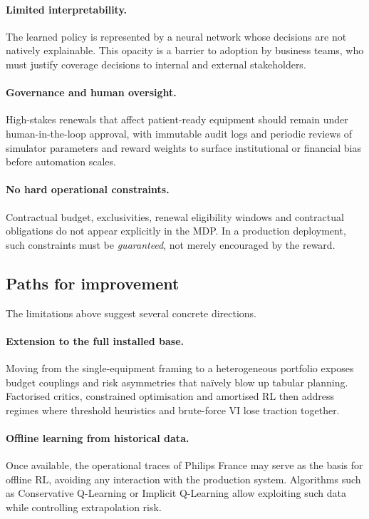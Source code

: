 \paragraph{Limited interpretability.}
The learned policy is represented by a neural network whose decisions are
not natively explainable. This opacity is a barrier to adoption by business
teams, who must justify coverage decisions to internal and external
stakeholders.

\paragraph{Governance and human oversight.}
High-stakes renewals that affect patient-ready equipment should remain under
human-in-the-loop approval, with immutable audit logs and periodic reviews of
simulator parameters and reward weights to surface institutional or financial
bias before automation scales.

\paragraph{No hard operational constraints.}
Contractual budget, exclusivities, renewal eligibility windows and
contractual obligations do not appear explicitly in the MDP. In a production
deployment, such constraints must be \emph{guaranteed}, not merely
encouraged by the reward.


\subsection{Paths for improvement}
\label{subsec:improvements}

The limitations above suggest several concrete directions.

\paragraph{Extension to the full installed base.}
Moving from the single-equipment framing to a heterogeneous portfolio exposes
budget couplings and risk asymmetries that naïvely blow up tabular planning.
Factorised critics, constrained optimisation and amortised RL then address
regimes where threshold heuristics and brute-force VI lose traction together.

\paragraph{Offline learning from historical data.}
Once available, the operational traces of Philips France may serve as the
basis for offline RL, avoiding any interaction with the production system.
Algorithms such as Conservative Q-Learning or Implicit Q-Learning allow
exploiting such data while controlling extrapolation risk.

